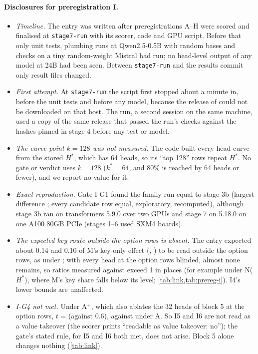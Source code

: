 \paragraph{Disclosures for preregistration I.}
\begin{itemize}\setlength\itemsep{1pt}
  \item \emph{Timeline.} The entry was written after preregistrations A--H were scored and finalised at \texttt{stage7-run} with its scorer, code and GPU script. Before that only unit tests, plumbing runs at Qwen2.5-0.5B with random bases and checks on a tiny random-weight Mistral had run; no head-level output of any model at 24B had been seen. Between \texttt{stage7-run} and the results commit only result files changed.
  \item \emph{First attempt.} At \texttt{stage7-run} the script first stopped about a minute in, before the unit tests and before any model, because the release of \citet{anonymous2026fitted} could not be downloaded on that host. The run, a second session on the same machine, used a copy of the same release that passed the run's checks against the hashes pinned in stage 4 before any test or model.
  \item \emph{The curve point $k = 128$ was not measured.} The code built every head curve from the stored $H^*$, which has 64 heads, so its ``top 128'' rows repeat $H^*$. No gate or verdict uses $k = 128$ ($k^* = 64$, and 80\% is reached by 64 heads or fewer), and we report no value for it.
  \item \emph{Exact reproduction.} Gate I-G1 found the family run equal to stage 3b (largest difference \IgoneaMaxDiff{}; every candidate row equal, exploratory, recomputed), although stage 3b ran on transformers 5.9.0 over two GPUs and stage 7 on 5.18.0 on one A100 80GB PCIe (stages 1--6 used SXM4 boards).
  \item \emph{The expected key route outside the option rows is absent.} The entry expected about 0.14 and 0.10 of M's key-only effect (\fmtOpt{}, \fmtLetter{}) to be read outside the option rows, as under \fmtNone{}; with every head at the option rows blinded, almost none remains, so ratios measured against \fmtNone{} exceed 1 in places (for example under N($H^*$), where M's key share falls below its \fmtNone{} level; \cref{tab:link,tab:prereg-i}). I4's lower bounds are unaffected.
  \item \emph{I-G4 not met.} Under A$^+$, which also ablates the 32 heads of block 5 at the option rows, $t$ = \IgfourT{} (against 0.6), against \IsixT{} under A. So I5 and I6 are not read as a value takeover (the scorer prints ``readable as value takeover: no''); the gate's stated rule, for I5 and I6 both met, does not arise. Block 5 alone changes nothing (\cref{tab:link}).

\end{itemize}

